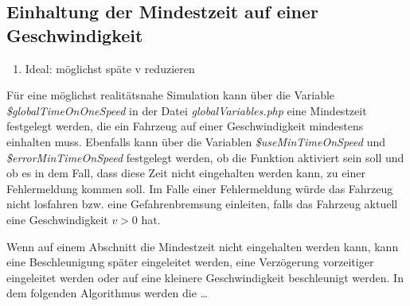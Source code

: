 \subsection{Einhaltung der Mindestzeit auf einer Geschwindigkeit} \label{minTime}

\begin{enumerate}
\item Ideal: möglichst späte v reduzieren
\end{enumerate}

Für eine möglichst realitätsnahe Simulation kann über die Variable \textit{\$globalTimeOnOneSpeed} in der Datei \textit{globalVariables.php} eine Mindestzeit festgelegt werden, die ein Fahrzeug auf einer Geschwindigkeit mindestens einhalten muss. Ebenfalls kann über die Variablen \textit{\$useMinTimeOnSpeed} und \textit{\$errorMinTimeOnSpeed} festgelegt werden, ob die Funktion aktiviert sein soll und ob es in dem Fall, dass diese Zeit nicht eingehalten werden kann, zu einer Fehlermeldung kommen soll. Im Falle einer Fehlermeldung würde das Fahrzeug nicht losfahren bzw. eine Gefahrenbremsung einleiten, falls das Fahrzeug aktuell eine Geschwindigkeit $v > 0$ hat. 

Wenn auf einem Abschnitt die Mindestzeit nicht eingehalten werden kann, kann eine Beschleunigung später eingeleitet werden, eine Verzögerung vorzeitiger eingeleitet werden oder auf eine kleinere Geschwindigkeit beschleunigt werden. In dem folgenden Algorithmus werden die \dots

